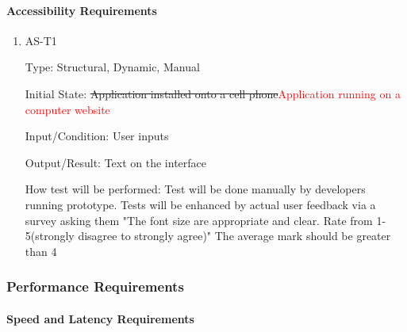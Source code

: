 \documentclass[12pt, titlepage]{article}
\begin{document}
\paragraph{Accessibility Requirements}

\begin{enumerate}

\item{AS-T1\\}

Type: Structural, Dynamic, Manual
					
Initial State: \sout{Application installed onto a cell phone}\textcolor{red}{Application running on a computer website}
					
Input/Condition: User inputs
					
Output/Result: Text on the interface
					
How test will be performed: Test will be done manually by developers running prototype. Tests will be enhanced by actual user feedback via a survey asking them "The font size are appropriate and clear. Rate from 1-5(strongly disagree to strongly agree)" The average mark should be greater than 4

\end{enumerate}

\subsubsection{Performance Requirements}
		
\paragraph{Speed and Latency Requirements}
\end{document}
